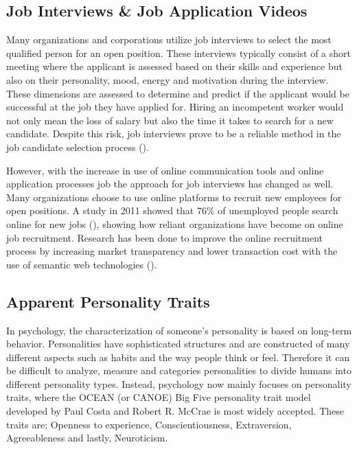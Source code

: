 \subsection{Job Interviews \& Job Application Videos}
Many organizations and corporations utilize job interviews to select the most qualified person for an open position. These interviews typically consist of a short meeting where the applicant is assessed based on their skills and experience but also on their personality, mood, energy and motivation during the interview. These dimensions are assessed to determine and predict if the applicant would be successful at the job they have applied for. Hiring an incompetent worker would not only mean the loss of salary but also the time it takes to search for a new candidate. Despite this risk, job interviews prove to be a reliable method in the job candidate selection process (\cite{weekley1987reliability}). 

However, with the increase in use of online communication tools and online application processes job the approach for job interviews has changed as well. Many organizations choose to use online platforms to recruit new employees for open positions. A study in 2011 showed that 76\% of unemployed people search online for new jobs (\cite{faberman2016does}), showing how reliant organizations have become on online job recruitment. Research has been done to improve the online recruitment process by increasing market transparency and lower transaction cost with the use of semantic web technologies (\cite{bizer2005impact}).  

\subsection{Apparent Personality Traits}
In psychology, the characterization of someone's personality is based on long-term behavior. Personalities have sophisticated structures and are constructed of many different aspects such as habits and the way people think or feel. Therefore it can be difficult to analyze, measure and categories personalities to divide humans into different personality types. Instead, psychology now mainly focuses on personality traits, where the OCEAN (or CANOE) Big Five personality trait model developed by Paul Costa and Robert R. McCrae is most widely accepted. These traits are; Openness to experience, Conscientiousness, Extraversion, Agreeableness and lastly, Neuroticism. 

